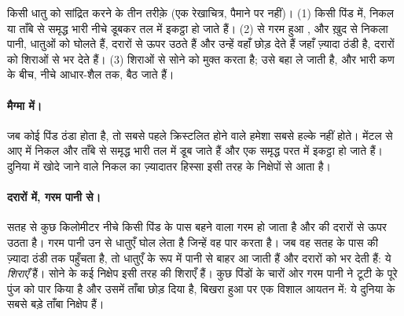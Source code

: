 \begin{omfigure}
{\small किसी धातु को सांद्रित करने के तीन तरीक़े (एक रेखाचित्र, पैमाने पर नहीं)। (1) किसी
 पिंड में, निकल या ताँबे से समृद्ध भारी  नीचे डूबकर तल में इकट्ठा हो जाते हैं।
(2)  से गरम हुआ , और ख़ुद  से निकला पानी, धातुओं को घोलते हैं, दरारों
से ऊपर उठते हैं और उन्हें वहाँ छोड़ देते हैं जहाँ  ज़्यादा ठंडी है, दरारों को शिराओं से
भर देते हैं। (3)  शिराओं से सोने को मुक्त करता है;  उसे बहा ले जाती है, और भारी
कण  के बीच, नीचे आधार-शैल तक, बैठ जाते
हैं।}
\label{fig:g9:earth-resources:deposits}
\end{omfigure}

\paragraph{मैग्मा में।} जब कोई  पिंड ठंडा होता है, तो सबसे पहले क्रिस्टलित होने वाले
 हमेशा सबसे हल्के नहीं होते। मेंटल से आए  में निकल और ताँबे से समृद्ध भारी 
तल में डूब जाते हैं और एक समृद्ध परत में इकट्ठा हो जाते हैं। दुनिया में खोदे जाने वाले निकल
का ज़्यादातर हिस्सा इसी तरह के निक्षेपों से आता
है।

\paragraph{दरारों में, गरम पानी से।} सतह से कुछ किलोमीटर नीचे किसी  पिंड के पास
बहने वाला  गरम हो जाता है और  की दरारों से ऊपर उठता है। गरम पानी उन  से
धातुएँ घोल लेता है जिन्हें वह पार करता है। जब वह सतह के पास की ज़्यादा ठंडी  तक
पहुँचता है, तो धातुएँ  के रूप में पानी से बाहर आ जाती हैं और दरारों को भर देती हैं:
ये \emph{शिराएँ} हैं। सोने के कई निक्षेप इसी तरह की शिराएँ हैं। कुछ 
पिंडों के चारों ओर गरम पानी ने टूटी  के पूरे पुंज को पार किया है और उसमें ताँबा छोड़
दिया है, बिखरा हुआ पर एक विशाल आयतन में: ये दुनिया के सबसे बड़े ताँबा निक्षेप
हैं।

